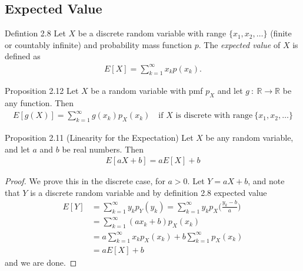 \subsection{Expected Value}
\begin{boks}{Defintion 2.8}
Let $X$ be a discrete random variable with range $\{x_1,x_2, \ldots\}$ (finite or countably infinite) and probability mass function $p$. The \textit{expected value} of $X$ is defined as
\begin{align*}
    E[X] = \sum_{k=1}^\infty x_k p(x_k).
\end{align*}
\end{boks}

\begin{boks}{Proposition 2.12}
  Let $X$ be a random variable with pmf $p_X$ and let $g \ : \ \mathbb{R} \rightarrow \mathbb{R}$ be any function. Then
  \begin{align*}
    E[g(X)] = \sum_{k = 1}^\infty g(x_k)p_X(x_k) \quad \text{if $X$ is discrete with range} \ \{x_1, x_2, \ldots\}
  \end{align*}
\end{boks}

%

\begin{boks}{Proposition 2.11 (Linearity for the Expectation)}
Let $X$ be any random variable, and let $a$ and $b$ be real numbers. Then
\begin{align*}
    E[aX + b] = aE[X] + b
\end{align*}
\end{boks}

\begin{proof}
We prove this in the discrete case, for $a > 0$. Let $Y = aX + b$, and note that $Y$ is a discrete random variable and by definition 2.8 expected value
\begin{align*}
    E[Y] &= \sum_{k=1}^\infty y_kp_Y(y_k) = \sum_{k=1}^\infty y_kp_X\bigg(\frac{y_k - b}{a}\bigg)\\
    &= \sum_{k=1}^\infty (ax_k + b) p_X(x_k) \\
    &= a\sum_{k=1}^\infty x_kp_X(x_k) + b \sum_{k=1}^\infty p_X(x_k)\\
    &= aE[X] + b
\end{align*}
and we are done.
\end{proof}

